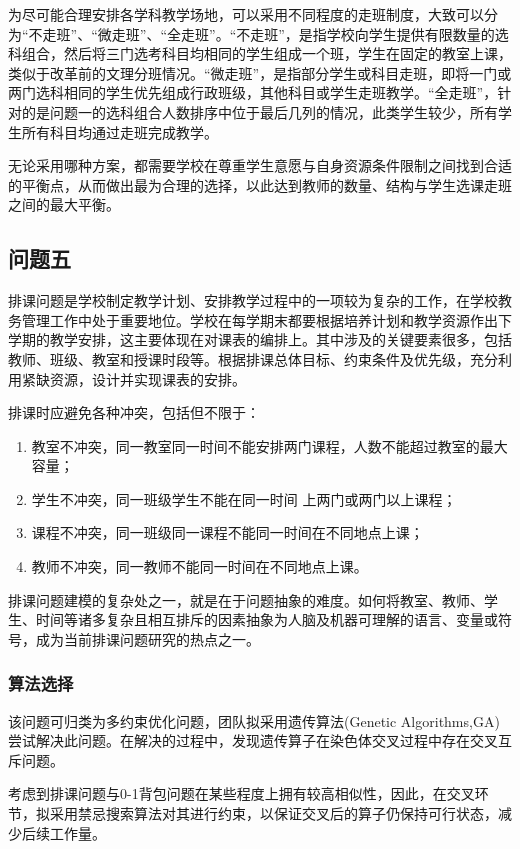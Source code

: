 \documentclass[bwprint]{cumcmthesis}
\begin{document}
为尽可能合理安排各学科教学场地，可以采用不同程度的走班制度，大致可以分为“不走班”、“微走班”、“全走班”。“不走班”，是指学校向学生提供有限数量的选科组合，然后将三门选考科目均相同的学生组成一个班，学生在固定的教室上课，类似于改革前的文理分班情况。“微走班”，是指部分学生或科目走班，即将一门或两门选科相同的学生优先组成行政班级，其他科目或学生走班教学。“全走班”，针对的是问题一的选科组合人数排序中位于最后几列的情况，此类学生较少，所有学生所有科目均通过走班完成教学。

无论采用哪种方案，都需要学校在尊重学生意愿与自身资源条件限制之间找到合适的平衡点，从而做出最为合理的选择，以此达到教师的数量、结构与学生选课走班之间的最大平衡。


\subsection{问题五}
排课问题是学校制定教学计划、安排教学过程中的一项较为复杂的工作，在学校教务管理工作中处于重要地位。学校在每学期末都要根据培养计划和教学资源作出下学期的教学安排，这主要体现在对课表的编排上。其中涉及的关键要素很多，包括教师、班级、教室和授课时段等。根据排课总体目标、约束条件及优先级，充分利用紧缺资源，设计并实现课表的安排。

排课时应避免各种冲突，包括但不限于：
\begin{enumerate}
	\item 教室不冲突，同一教室同一时间不能安排两门课程，人数不能超过教室的最大容量；
	\item 学生不冲突，同一班级学生不能在同一时间
	上两门或两门以上课程；
	\item 课程不冲突，同一班级同一课程不能同一时间在不同地点上课；
	\item 教师不冲突，同一教师不能同一时间在不同地点上课。
\end{enumerate}

排课问题建模的复杂处之一，就是在于问题抽象的难度。如何将教室、教师、学生、时间等诸多复杂且相互排斥的因素抽象为人脑及机器可理解的语言、变量或符号，成为当前排课问题研究的热点之一。


\subsubsection{算法选择}
该问题可归类为多约束优化问题，团队拟采用遗传算法(Genetic  Algorithms,GA)\cite{gen2007genetic}尝试解决此问题\cite{顾运筠2006遗传算法应用于排课问题中的教师安排最优化}\cite{唐勇2002基于遗传算法的排课系统}。在解决的过程中，发现遗传算子在染色体交叉过程中存在交叉互斥问题。

考虑到排课问题与0-1背包问题在某些程度上拥有较高相似性，因此，在交叉环节，拟采用禁忌搜索算法对其进行约束\cite{mantawy1999integrating}\cite{李大卫1998遗传算法与禁忌搜索算法的混合策略}，以保证交叉后的算子仍保持可行状态，减少后续工作量。
\end{document}
